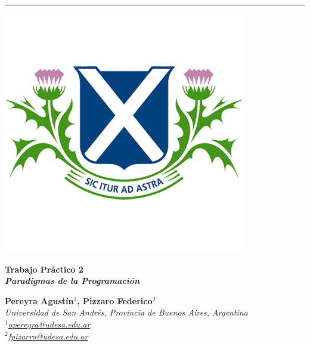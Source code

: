 \documentclass[11pt, a4paper]{article}
\begin{document}
\vspace*{1cm} 

{\noindent\rule{\textwidth}{0.5pt}}
\noindent
\begin{minipage}{0.24\textwidth}
    \includegraphics[width=\linewidth]{figures/logo2.png}
\end{minipage}
\hspace{0.02\textwidth}
\begin{minipage}{0.7\textwidth}
    {\fontsize{32}{36}\selectfont\bfseries\color{udesaBlue}\selectfont Trabajo Práctico 2}\\
    {\fontsize{20}{24}\selectfont\bfseries\itshape\color{udesaGreen} Paradigmas de la Programación}
\end{minipage}

\begin{minipage}{0.8\textwidth}
    {\large\textbf{\color{udesaBlue} Pereyra Agustín$^{1}$, \color{udesaGreen}Pizzaro Federico$^{2}$}}\\
    {\itshape\small
    Universidad de San Andrés, Provincia de Buenos Aires, Argentina\\
    $^1$\href{mailto:apereyra@udesa.edu.ar}{apereyra@udesa.edu.ar}\\
    $^2$\href{mailto:fpizarro@udesa.edu.ar}{fpizarro@udesa.edu.ar}
}
\end{minipage}
\vspace{0.5cm}
\end{document}
